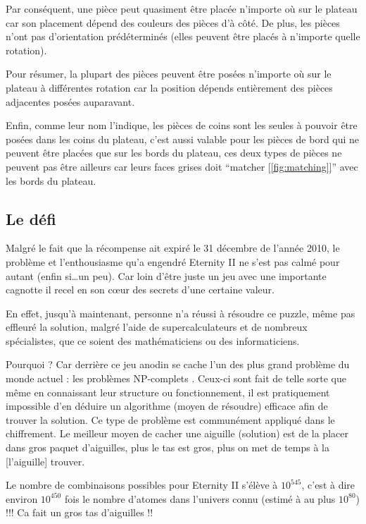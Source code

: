 	Par conséquent, une pièce peut quasiment être placée n'importe où sur le plateau car son placement dépend des couleurs des pièces d'à côté. De plus, les pièces n'ont pas d'orientation prédéterminés (elles peuvent être placés à n'importe quelle rotation).
	
	Pour résumer, la plupart des pièces peuvent être posées n'importe où sur le plateau à différentes rotation car la position dépends entièrement des pièces adjacentes posées auparavant. 
	
	Enfin, comme leur nom l'indique, les pièces de coins sont les seules à pouvoir être posées dans les coins du plateau, c'est aussi valable pour les pièces de bord qui ne peuvent être placées que sur les bords du plateau, ces deux types de pièces ne peuvent pas être ailleurs car leurs faces grises doit \enquote{matcher [\autoref{fig:matching}]} avec les bords du plateau.
	
	\newpage
	\subsection{Le défi}
	
	Malgré le fait que la récompense ait expiré le 31 décembre de l'année 2010, le problème et l'enthousiasme qu'a engendré Eternity II ne s'est pas calmé pour autant (enfin si\dots un peu). Car loin d'être juste un jeu avec une importante cagnotte il recel en son c\oe ur des secrets d'une certaine valeur.
	
	En effet, jusqu'à maintenant, personne n'a réussi à résoudre ce puzzle, même pas effleuré la solution, malgré l'aide de supercalculateurs et de nombreux spécialistes, que ce soient des mathématiciens ou des informaticiens.
	
	Pourquoi ? Car derrière ce jeu anodin se cache l'un des plus grand problème du monde actuel : les problèmes NP-complets \autocite{wiki:np_complet}. Ceux-ci sont fait de telle sorte que même en connaissant leur structure ou fonctionnement, il est pratiquement impossible d'en déduire un algorithme (moyen de résoudre) efficace afin de trouver la solution. Ce type de problème est communément appliqué dans le chiffrement. Le meilleur moyen de cacher une aiguille (solution) est de la placer dans gros paquet d'aiguilles, plus le tas est gros, plus on met de temps à la [l'aiguille] trouver.
	
	\begin{exmp}
		Le nombre de combinaisons possibles pour Eternity II s'élève à $10^{545}$, c'est à dire environ $10^{450}$ fois le nombre d'atomes dans l'univers connu (estimé à au plus $10^{80}$) !!! Ca fait un gros tas d'aiguilles !!
	\end{exmp}
	
